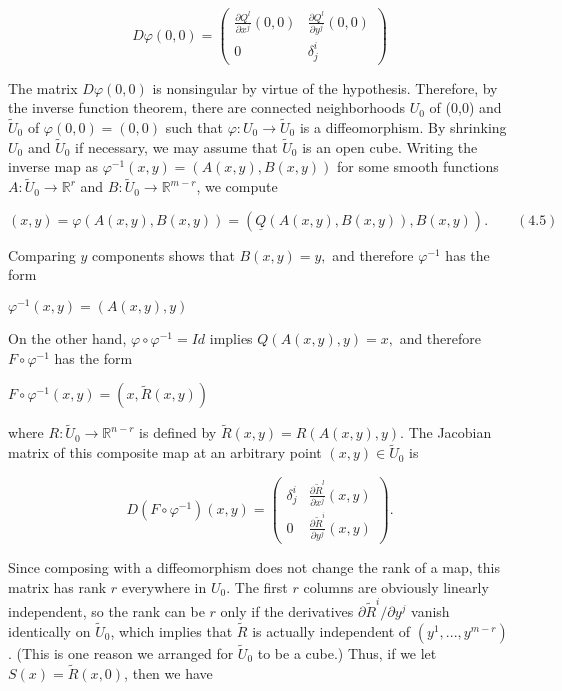 \[D\varphi(0,0)=
\begin{pmatrix}
\frac{\partial Q^{l}}{\partial x^{j}}(0,0) & \frac{\partial Q^{l}}{\partial y^{j}}(0,0) \\
0 & \delta_{j}^{i}
\end{pmatrix}
\] 

The matrix \(D\varphi(0,0)\) is nonsingular by virtue of the hypothesis. 
Therefore, by the inverse function theorem, there are connected neighborhoods \(U_{0}\) of (0,0) and \(\tilde{U}_{0}\) of \(\varphi(0,0)=(0,0)\) such that \(\varphi: U_0 \rightarrow \tilde{U}_0\) is a diffeomorphism. 
By shrinking \(U_{0}\) and \(\tilde{U}_{0}\) if necessary, we may assume that \(\tilde{U}_{0}\) is an open cube. 
Writing the inverse map as \(\varphi^{-1}(x,y)=(A(x,y),B(x,y))\) for some smooth functions 
\(A: \tilde{U}_0 \rightarrow \mathbb{R}^r\) and \(B:\tilde{U}_{0}\rightarrow\mathbb{R}^{m-r}\), we compute

\((x,y)=\varphi(A(x,y),B(x,y))=(\underline{Q}(A(x,y),B(x,y)),B(x,y)). \qquad (4.5)\)

Comparing \(y\) components shows that \(B(x,y)=y,\) and therefore \(\varphi^{-1}\) has the form

\(\varphi^{-1}(x,y)=(A(x,y),y)\)

On the other hand, \(\varphi\circ\varphi^{-1}=Id\) implies \(Q(A(x,y),y)=x,\) and therefore \(F\circ\varphi^{-1}\) has the form

\(F\circ\varphi^{-1}(x,y)=(x,\tilde{R}(x,y))\)

where \(R: \tilde{U}_{0}\rightarrow\mathbb{R}^{n-r}\) is defined by \(\tilde{R}(x,y)=R(A(x,y),y)\). The Jacobian matrix of this composite map at an arbitrary point \((x,y)\in\tilde{U}_{0}\) is

\[D(F\circ\varphi^{-1})(x,y)=
\begin{pmatrix}
\delta_{j}^{i} & \frac{\partial\tilde{R}^{l}}{\partial x^{j}}(x,y) \\
0 & \frac{\partial\tilde{R}^{i}}{\partial y^{j}}(x,y)
\end{pmatrix}.\]

Since composing with a diffeomorphism does not change the rank of a map, this matrix has rank \(r\) everywhere in \(U_{0}\). The first \(r\) columns are obviously linearly independent, so the rank can be \(r\) only if the derivatives \(\partial \tilde{R}^{i} / \partial y^{j}\) vanish identically on \(\tilde{U}_{0}\), which implies that \(\tilde{R}\) is actually independent of \((y^{1},...,y^{m-r})\). (This is one reason we arranged for \(\tilde{U}_{0}\) to be a cube.) Thus, if we let \(S(x)=\tilde{R}(x,0)\), then we have

